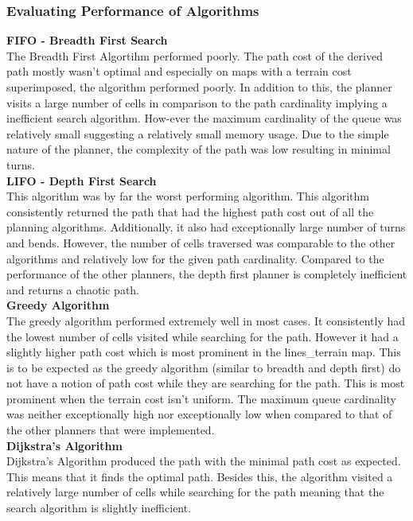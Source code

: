 \documentclass[a4paper,12pt]{article}
\begin{document}
			\subsubsection{Evaluating Performance of Algorithms}
				\textbf{FIFO - Breadth First Search}
				\\
				The Breadth First Algortihm performed poorly. The path cost of the derived path mostly wasn't optimal and especially on maps with a terrain cost superimposed, the algorithm performed poorly. In addition to this, the planner visits a large number of cells in comparison to the path cardinality implying a inefficient search algorithm. How-ever the maximum cardinality of the queue was relatively small suggesting a relatively small memory usage. Due to the simple nature of the planner, the complexity of the path was low resulting in minimal turns.
				\\
				\textbf{LIFO - Depth First Search}
				\\
				This algorithm was by far the worst performing algorithm. This algorithm consistently returned the path that had the highest path cost out of all the planning algorithms. Additionally, it also had exceptionally large number of turns and bends. However, the number of cells traversed was comparable to the other algorithms and relatively low for the given path cardinality. Compared to the performance of the other planners, the depth first planner is completely inefficient and returns a chaotic path.
				\\
				\textbf{Greedy Algorithm}
				\\
				The greedy algorithm performed extremely well in most cases. It consistently had the lowest number of cells visited while searching for the path. However it had a slightly higher path cost which is most prominent in the lines\_terrain map. This is to be expected as the greedy algorithm (similar to breadth and depth first) do not have a notion of path cost while they are searching for the path. This is most prominent when the terrain cost isn't uniform. The maximum queue cardinality was neither exceptionally high nor exceptionally low when compared to that of the other planners that were implemented. 
				\\
				\textbf{Dijkstra's Algorithm}
				\\
				Dijkstra's Algorithm produced the path with the minimal path cost as expected. This means that it finds the optimal path. Besides this, the algorithm visited a relatively large number of cells while searching for the path meaning that the search algorithm is slightly inefficient. 
\end{document}

